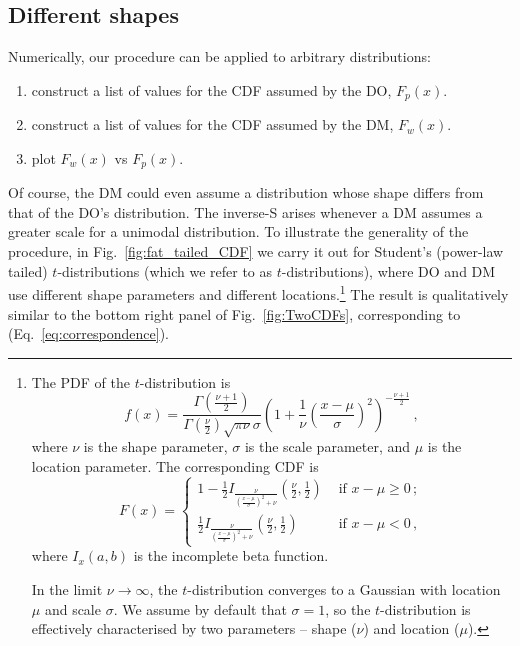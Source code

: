 \documentclass[a4paper, 12pt]{article}
\newcommand{\eref}[1]{(Eq.~\ref{eq:#1})}
\newcommand{\fref}[1]{Fig.~\ref{fig:#1}}
\newcommand{\seclabel}[1]{\label{sec:#1}}
\newcommand{\be}{\begin{equation}}
\newcommand{\ee}{\end{equation}}
\begin{document}
\subsection{Different shapes\seclabel{Different_shapes}}
Numerically, our procedure can be applied to arbitrary distributions: 
\begin{enumerate}
\item
construct a list of values for the CDF assumed by the DO, $F_p(x)$.
\item
construct a list of values for the CDF assumed by the DM, $F_w(x)$.
\item
plot $F_w(x)$ vs $F_p(x)$.
\end{enumerate}
Of course, the DM could even assume a distribution whose shape differs from that of the DO's distribution. 
The inverse-S arises whenever a DM assumes a greater scale for a unimodal distribution. 
To illustrate the generality of the procedure, in \fref{fat_tailed_CDF} we carry it out for Student's (power-law tailed) $t$-distributions (which we refer to as $t$-distributions), where DO and DM use different shape parameters and different locations.\footnote{The PDF of the $t$-distribution is
%
\be
f\left(x\right) = \frac{\Gamma\left(\frac{\nu+1}{2}\right)} {\Gamma\left(\frac{\nu}{2}\right)\sqrt{\pi\nu}\sigma} \left(1+\frac{1}{\nu}\left(\frac{x-\mu}{\sigma}\right)^2 \right)^{-\frac{\nu+1}{2}}\,,
\ee
%
where $\nu$ is the shape parameter, $\sigma$ is the scale parameter, and $\mu$ is the location parameter. The corresponding CDF is
%
\be
F\left(x\right) = 
\begin{cases}
1 - \frac{1}{2} I_{\frac{\nu}{\left(\frac{x-\mu}{\sigma}\right)^2 + \nu}}\left(\frac{\nu}{2},\frac{1}{2}\right) &\text{ if } x-\mu \geq 0\,;\\
\frac{1}{2} I_{\frac{\nu}{\left(\frac{x-\mu}{\sigma}\right)^2 + \nu}}\left(\frac{\nu}{2},\frac{1}{2}\right) &\text{ if } x-\mu < 0\,,
\end{cases}
\ee
%
where $I_x\left(a,b\right)$ is the incomplete beta function.

In the limit $\nu \rightarrow \infty$, the $t$-distribution converges to a Gaussian with location $\mu$ and scale $\sigma$. We assume by default that $\sigma = 1$, so the $t$-distribution is effectively characterised by two parameters -- shape ($\nu$) and location ($\mu$).
}
The result is qualitatively similar to the bottom right panel of \fref{TwoCDFs}, corresponding to \eref{correspondence}. 
\end{document}
